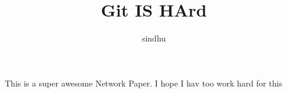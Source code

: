 \documentclass[10pt]{article}
\author{sindhu}
\title{Git IS HArd}
\begin{document}
           \maketitle
            
             This is a super awesome Network Paper.
              I hope I hav too work hard for this
\end{document}
